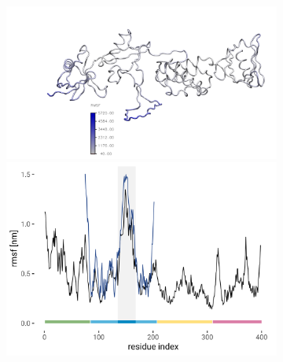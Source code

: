 \documentclass[
  twocolumn]{biophys-new-mod}
\begin{document}
\begin{figure}

\begin{minipage}[t]{0.50\linewidth}

{\centering 

\begin{figure}

\begin{minipage}[t]{\linewidth}

{\centering 

\includegraphics{./assets/results/figures/loop-rmsf.png}
\includegraphics{./results/plots/ferm-rmsf-1.png}

}

\end{minipage}%

\caption{~}

\end{figure}

}


\end{minipage}
\end{figure}
\end{document}

